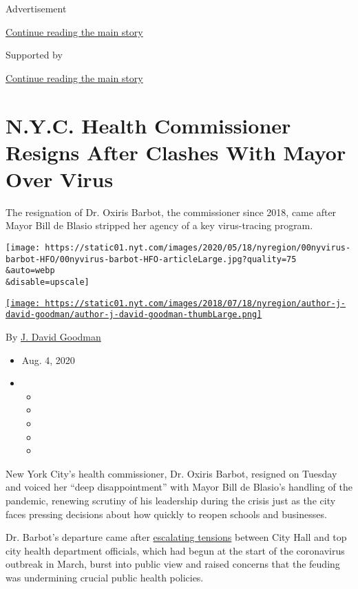 Advertisement

\protect\hyperlink{after-top}{Continue reading the main story}

Supported by

\protect\hyperlink{after-sponsor}{Continue reading the main story}

\hypertarget{nyc-health-commissioner-resigns-after-clashes-with-mayor-over-virus}{%
\section{N.Y.C. Health Commissioner Resigns After Clashes With Mayor
Over
Virus}\label{nyc-health-commissioner-resigns-after-clashes-with-mayor-over-virus}}

The resignation of Dr. Oxiris Barbot, the commissioner since 2018, came
after Mayor Bill de Blasio stripped her agency of a key virus-tracing
program.

\texttt{[image: https://static01.nyt.com/images/2020/05/18/nyregion/00nyvirus-barbot-HFO/00nyvirus-barbot-HFO-articleLarge.jpg?quality=75\\\&auto=webp\\\&disable=upscale]}

\href{https://www.nytimes.com/by/j-david-goodman}{\texttt{[image: https://static01.nyt.com/images/2018/07/18/nyregion/author-j-david-goodman/author-j-david-goodman-thumbLarge.png]}}

By \href{https://www.nytimes.com/by/j-david-goodman}{J. David Goodman}

\begin{itemize}
\item
  Aug. 4, 2020
\item
  \begin{itemize}
  \item
  \item
  \item
  \item
  \item
  \end{itemize}
\end{itemize}

New York City's health commissioner, Dr. Oxiris Barbot, resigned on
Tuesday and voiced her ``deep disappointment'' with Mayor Bill de
Blasio's handling of the pandemic, renewing scrutiny of his leadership
during the crisis just as the city faces pressing decisions about how
quickly to reopen schools and businesses.

Dr. Barbot's departure came after
\href{https://www.nytimes.com/2020/05/14/nyregion/coronavirus-de-blasio-mitchell-katz.html}{escalating
tensions} between City Hall and top city health department officials,
which had begun at the start of the coronavirus outbreak in March, burst
into public view and raised concerns that the feuding was undermining
crucial public health policies.

